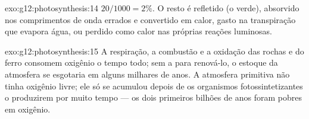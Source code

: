 \begin{solution}{exo:g12:photosynthesis:14}
$20/1000 = 2\%$. O resto é refletido (o verde), absorvido nos
comprimentos de onda errados e convertido em calor, gasto na
transpiração que evapora água, ou perdido como calor nas próprias
reações luminosas.
\end{solution}

\begin{solution}{exo:g12:photosynthesis:15}
A respiração, a combustão e a oxidação das rochas e do ferro consomem
oxigênio o tempo todo; sem a  para renová-lo, o estoque da
atmosfera se esgotaria em alguns milhares de anos. A atmosfera primitiva
não tinha oxigênio livre; ele só se acumulou depois de os organismos
fotossintetizantes o produzirem por muito tempo --- os dois primeiros
bilhões de anos foram pobres em oxigênio.
\end{solution}

